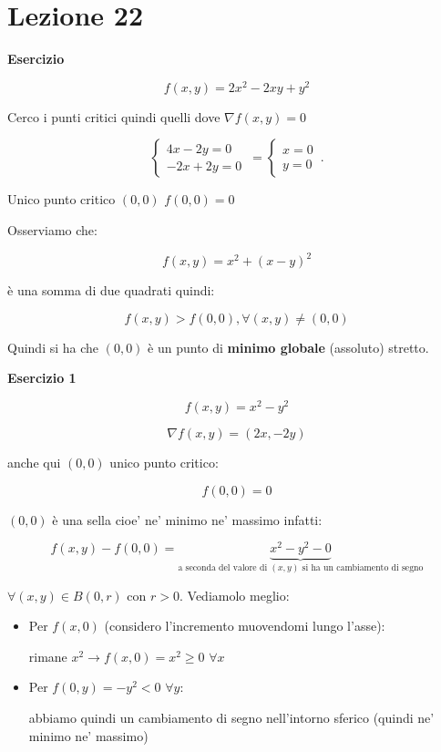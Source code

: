 \documentclass[../appunti-analisi.tex]{subfiles}
\begin{document}
\section{Lezione 22}

\textbf{Esercizio}

\[
    f(x,y) = 2x^{2} - 2xy +y^{2}
\]

Cerco i punti critici quindi quelli dove $\nabla f(x,y) = 0$

\[
    \begin{cases}
           4x -2y = 0\\
           -2x +2y = 0
    \end{cases}\, =
    \begin{cases}
           x= 0\\
           y = 0
    \end{cases}\,.
\]

Unico punto critico $(0,0)$ $f(0,0)=0$

Osserviamo che:

\[
    f(x,y) = x^{2} + (x-y)^{2}
\]

è una somma di due quadrati quindi:

\[
    f(x,y) > f(0,0),\forall (x,y) \neq (0,0)
\]

Quindi si ha che $(0,0)$ è  un punto di \textbf{minimo globale} (assoluto) stretto.


\textbf{Esercizio 1} 

\[
    f(x,y) = x^{2}-y^{2}
\]

\[
    \nabla f(x,y) = (2x, -2y)
\]

anche qui $(0,0)$ unico punto critico:

\[
    f(0,0) = 0
\]

$(0,0)$ è una sella cioe' ne' minimo ne' massimo infatti:

\[
    f(x,y) - f(0,0) = \underbrace{x^{2}-y^{2}-0}_\text{a seconda del valore di $(x,y)$ si ha un cambiamento di segno}
\]

$\forall (x,y) \in B(0,r)$ con $r>0$. Vediamolo meglio:

\begin{itemize}
    \item Per $f(x,0)$ (considero l'incremento muovendomi lungo l'asse):

        rimane $x^{2} \rightarrow  f(x,0)=x^{2}\ge 0$ $\forall x$
    \item Per $f(0,y) = -y^{2} <0$ $\forall y$:

        abbiamo quindi un cambiamento di segno nell'intorno sferico (quindi ne' minimo ne' massimo)
\end{itemize}
\end{document}
